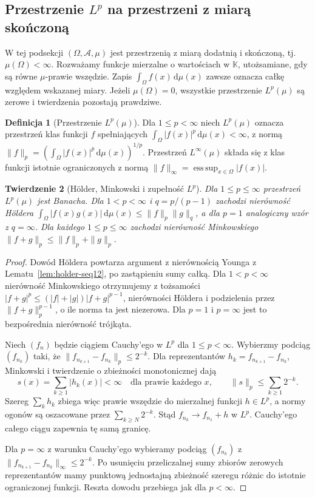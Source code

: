\documentclass[11pt,a4paper]{article}
\numberwithin{equation}{section}
\theoremstyle{plain}
\newtheorem{twierdzenie}{Twierdzenie}[section]
\theoremstyle{definition}
\newtheorem{definicja}[twierdzenie]{Definicja}
\theoremstyle{remark}
\newcommand{\K}{\mathbb K}
\begin{document}
\subsection{Przestrzenie \texorpdfstring{$L^p$}{Lp} na przestrzeni z miarą skończoną}

W tej podsekcji $(\Omega,\mathcal A,\mu)$ jest przestrzenią
z miarą dodatnią i skończoną, tj. $\mu(\Omega)<\infty$.
Rozważamy funkcje mierzalne o wartościach w $\K$, utożsamiane,
gdy są równe $\mu$-prawie wszędzie. Zapis
$\int_\Omega f(x)\,\mathrm d\mu(x)$ zawsze oznacza całkę
względem wskazanej miary. Jeżeli $\mu(\Omega)=0$, wszystkie
przestrzenie $L^p(\mu)$ są zerowe i twierdzenia pozostają prawdziwe.

\begin{definicja}[Przestrzenie $L^p(\mu)$]
\label{def:lp12}
Dla $1\le p<\infty$ niech $L^p(\mu)$ oznacza przestrzeń
klas funkcji $f$ spełniających
$\int_\Omega|f(x)|^p\,\mathrm d\mu(x)<\infty$, z normą
$\|f\|_p=(\int_\Omega|f(x)|^p\,\mathrm d\mu(x))^{1/p}$.
Przestrzeń $L^\infty(\mu)$ składa się z klas funkcji istotnie
ograniczonych z normą
$\|f\|_\infty=\operatorname*{ess\,sup}_{x\in\Omega}|f(x)|$.
\end{definicja}

\begin{twierdzenie}[H\"older, Minkowski i zupełność $L^p$]
\label{thm:lp-banach12}
Dla $1\le p\le\infty$ przestrzeń $L^p(\mu)$ jest Banacha.
Dla $1<p<\infty$ i $q=p/(p-1)$ zachodzi nierówność H\"oldera
$\int_\Omega|f(x)g(x)|\,\mathrm d\mu(x)\le\|f\|_p\|g\|_q$,
a dla $p=1$ analogiczny wzór z $q=\infty$.
Dla każdego $1\le p\le\infty$ zachodzi nierówność Minkowskiego
$\|f+g\|_p\le\|f\|_p+\|g\|_p$.
\end{twierdzenie}
\begin{proof}
Dowód H\"oldera powtarza argument z nierównością Younga
z Lematu~\ref{lem:holder-seq12}, po zastąpieniu sumy całką.
Dla $1<p<\infty$ nierówność Minkowskiego otrzymujemy z tożsamości
$|f+g|^p\le(|f|+|g|)|f+g|^{p-1}$, nierówności H\"oldera
i podzielenia przez $\|f+g\|_p^{p-1}$, o ile norma ta jest
niezerowa. Dla $p=1$ i $p=\infty$ jest to bezpośrednia
nierówność trójkąta.

Niech $(f_n)$ będzie ciągiem Cauchy'ego w $L^p$ dla
$1\le p<\infty$. Wybierzmy podciąg $(f_{n_k})$ taki, że
$\|f_{n_{k+1}}-f_{n_k}\|_p\le2^{-k}$.
Dla reprezentantów $h_k=f_{n_{k+1}}-f_{n_k}$,
Minkowski i twierdzenie o zbieżności monotonicznej dają
\[
 s(x)=\sum_{k\ge1}|h_k(x)|<\infty\quad\text{dla prawie każdego }x,
 \qquad \|s\|_p\le\sum_{k\ge1}2^{-k}.
\]
Szereg $\sum_kh_k$ zbiega więc prawie wszędzie do mierzalnej
funkcji $h\in L^p$, a normy ogonów są oszacowane przez
$\sum_{k\ge N}2^{-k}$. Stąd $f_{n_k}\to f_{n_1}+h$ w $L^p$.
Cauchy'ego całego ciągu zapewnia tę samą granicę.

Dla $p=\infty$ z warunku Cauchy'ego wybieramy podciąg
$(f_{n_k})$ z $\|f_{n_{k+1}}-f_{n_k}\|_\infty\le2^{-k}$.
Po usunięciu przeliczalnej sumy zbiorów zerowych
reprezentantów mamy punktową jednostajną zbieżność
szeregu różnic do istotnie ograniczonej funkcji.
Reszta dowodu przebiega jak dla $p<\infty$.
\end{proof}
\end{document}
